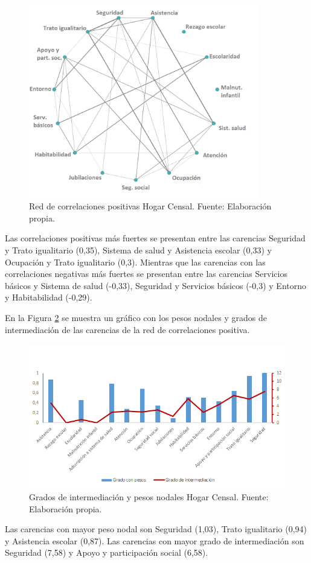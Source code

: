 \documentclass[12pt,letterpaper,spanish]{article}
\begin{document}
\begin{figure}[H]
  \centering
    \includegraphics[width=10cm]{Grafos/grafo_censal_pos.png}
    \caption{Red de correlaciones positivas Hogar Censal. Fuente: Elaboración propia.}
    \label{RedCensalpos}
\end{figure}


Las correlaciones positivas más fuertes se presentan entre las carencias Seguridad y Trato igualitario (0,35), Sistema de salud y Asistencia escolar (0,33) y Ocupación y Trato igualitario (0,3). Mientras que las carencias con las correlaciones negativas más fuertes se presentan entre las carencias Servicios básicos y Sistema de salud (-0,33), Seguridad y Servicios básicos (-0,3) y Entorno y Habitabilidad (-0,29). 

En la Figura \ref{CenCensal} se muestra un gráfico con los pesos nodales y grados de intermediación de las carencias de la red de correlaciones positiva.

\begin{figure}[H]
    \centering
    \includegraphics[width=\textwidth]{Grafos/nc_censal.png}
    \caption{Grados de intermediación y pesos nodales Hogar Censal. Fuente: Elaboración propia.}
    \label{CenCensal}
\end{figure}
Las carencias con mayor peso nodal son Seguridad (1,03), Trato igualitario (0,94) y Asistencia escolar (0,87). Las carencias con mayor grado de intermediación son Seguridad (7,58) y Apoyo y participación social (6,58).
\end{document}
